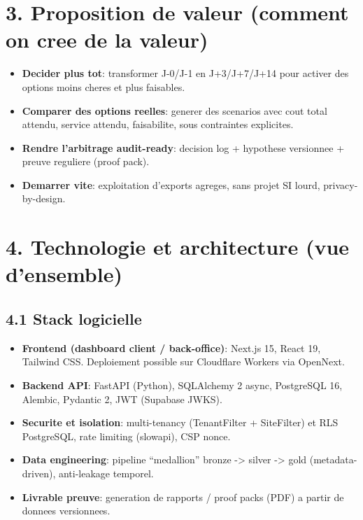\documentclass[11pt,a4paper]{article}
\begin{document}
\section*{3. Proposition de valeur (comment on cree de la valeur)}
\begin{itemize}
  \item \textbf{Decider plus tot}: transformer J-0/J-1 en J+3/J+7/J+14 pour activer des options moins cheres et plus faisables.
  \item \textbf{Comparer des options reelles}: generer des scenarios avec cout total attendu, service attendu, faisabilite, sous contraintes explicites.
  \item \textbf{Rendre l'arbitrage audit-ready}: decision log + hypothese versionnee + preuve reguliere (proof pack).
  \item \textbf{Demarrer vite}: exploitation d'exports agreges, sans projet SI lourd, privacy-by-design.
\end{itemize}

\section*{4. Technologie et architecture (vue d'ensemble)}
\subsection*{4.1 Stack logicielle}
\begin{itemize}
  \item \textbf{Frontend (dashboard client / back-office)}: Next.js 15, React 19, Tailwind CSS. Deploiement possible sur Cloudflare Workers via OpenNext.
  \item \textbf{Backend API}: FastAPI (Python), SQLAlchemy 2 async, PostgreSQL 16, Alembic, Pydantic 2, JWT (Supabase JWKS).
  \item \textbf{Securite et isolation}: multi-tenancy (TenantFilter + SiteFilter) et RLS PostgreSQL, rate limiting (slowapi), CSP nonce.
  \item \textbf{Data engineering}: pipeline ``medallion'' bronze -> silver -> gold (metadata-driven), anti-leakage temporel.
  \item \textbf{Livrable preuve}: generation de rapports / proof packs (PDF) a partir de donnees versionnees.
\end{itemize}
\end{document}

